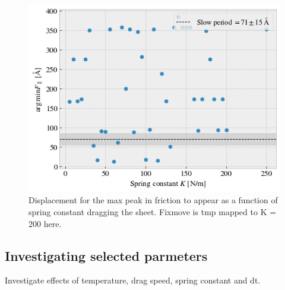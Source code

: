 \begin{figure}[H]
  \centering
  \includegraphics[width=0.6\linewidth]{figures/baseline/max_vs_K}
  \caption{Displacement for the max peak in friction to appear as a function of spring constant dragging the sheet. Fixmove is tmp mapped to K = 200 here.}
  \label{fig:max_vs_K}
\end{figure}

\newpage
\subsection{Investigating selected parmeters}
Investigate effects of temperature, drag speed, spring constant and dt.


